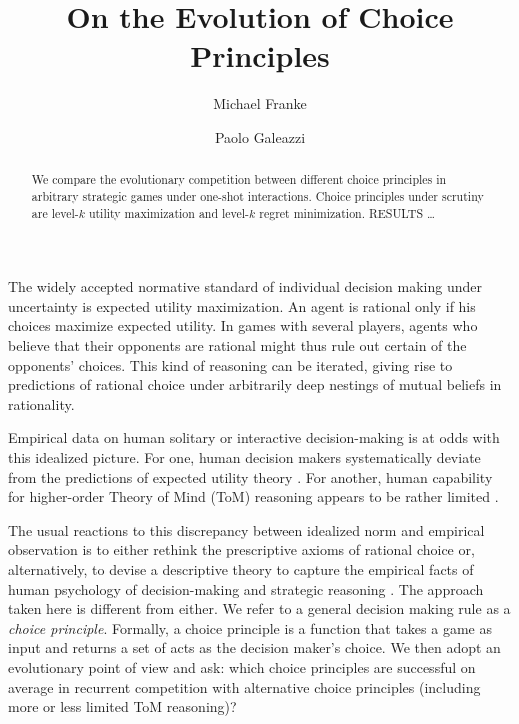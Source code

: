 \documentclass{llncs}
\title{On the Evolution of Choice Principles}
\author{Michael Franke\inst{1} \and Paolo Galeazzi \inst{2}}
\institute{Department of Linguistics, University of T\"{u}bingen \and
  Institute for Logic, Language and Computation, Universiteit van Amsterdam}
\date{}
\begin{document}
\maketitle

\begin{abstract}
  We compare the evolutionary competition between different choice
  principles in arbitrary strategic games under one-shot
  interactions. Choice principles under scrutiny are level-$k$
  utility maximization and level-$k$ regret minimization. RESULTS \dots
\end{abstract}



The widely accepted normative standard of individual decision making
under uncertainty is expected utility maximization. An agent is
rational only if his choices maximize expected utility. In games with
several players, agents who believe that their opponents are rational
might thus rule out certain of the opponents' choices. This kind of
reasoning can be iterated, giving rise to predictions of rational
choice under arbitrarily deep nestings of mutual beliefs in
rationality. %

Empirical data on human solitary or interactive decision-making is at
odds with this idealized picture. For one, human decision makers
systematically deviate from the predictions of expected utility theory
\citep[e.g.][]{TverskyKahnemann1974:Judgement-under,TverskyKahnemann1981:The-Framing-of-}. For
another, human capability for higher-order Theory of Mind (ToM)
reasoning appears to be rather limited \citep[e.g.][inter
alia]{HoCamerer1998:Iterated-Domina,KeyzarLin2003:Limits-on-Theor,VerbruggeMol2008:Learning-to-App,DegenFranke2013:Cost-Based-Prag}.

The usual reactions to this discrepancy between idealized norm and
empirical observation is to either rethink the prescriptive axioms of
rational choice or, alternatively, to devise a descriptive theory to
capture the empirical facts of human psychology of decision-making and
strategic reasoning
\citep[e.g.][]{Camerer2003:Behavioral-Game,GlimcherCamerer2009:Neuroeconomics:}. The
approach taken here is different from either. We refer to a general
decision making rule as a \emph{choice principle}. Formally, a choice
principle is a function that takes a game as input and returns a set
of acts as the decision maker's choice. We then adopt an evolutionary
point of view and ask: which choice principles are successful on
average in recurrent competition with alternative choice principles
(including more or less limited ToM reasoning)?
\end{document}
